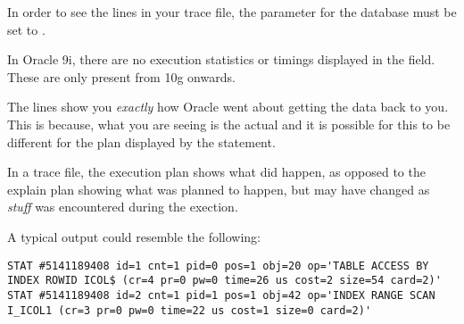 In order to see the  lines in your trace file, the  parameter for the database must be set to .

In Oracle 9i, there are no execution statistics or timings displayed in the  field. These are only present from 10g onwards.

The  lines show you \emph{exactly} how Oracle went about getting the data back to you. This is because, what you are seeing is the actual  and it is possible for this to be different for the plan displayed by the  statement. 

\begin{note}
In a trace file, the execution plan shows what did happen, as opposed to the explain plan showing what was planned to happen, but may have changed as \emph{stuff} was encountered during the exection.
\end{note}

A typical  output could resemble the following:

\begin{lstlisting}[numbers=none,caption={Stat Line}]
STAT #5141189408 id=1 cnt=1 pid=0 pos=1 obj=20 op='TABLE ACCESS BY INDEX ROWID ICOL$ (cr=4 pr=0 pw=0 time=26 us cost=2 size=54 card=2)'
STAT #5141189408 id=2 cnt=1 pid=1 pos=1 obj=42 op='INDEX RANGE SCAN I_ICOL1 (cr=3 pr=0 pw=0 time=22 us cost=1 size=0 card=2)'
\end{lstlisting}

